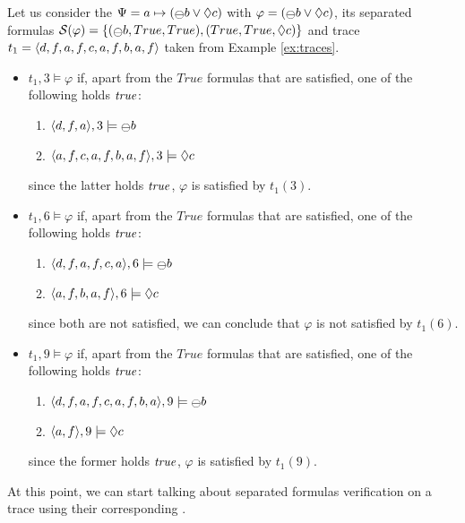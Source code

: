 \begin{example}\label{ex:subeval-formula}
Let us consider the \rcon\xspace $\Psi = a \mapsto (\Yesterday b \lOR \Diamond c)$ with $\varphi = (\Yesterday b \lOR \Diamond c)$, its separated formulas $\S(\varphi) = \{(\Yesterday b , True, True),(True, True, \Diamond c)\}$ and trace $t_1 = \langle d,f,a,f,c,a,f,b,a,f \rangle$ taken from Example \ref{ex:traces}.
\begin{itemize}
\item $t_1,3 \models \varphi$ if, apart from the $True$ formulas that are satisfied, one of the following holds $\mathit{true}$:
\begin{enumerate}
\item $\tup{d,f,a},3 \models \Yesterday b$
\item $\langle a,f,c,a,f,b,a,f \rangle,3 \models \Diamond c$
\end{enumerate}
since the latter holds $\mathit{true}$, $\varphi$ is satisfied by $t_1(3)$.

\item $t_1,6 \models \varphi$ if, apart from the $True$ formulas that are satisfied, one of the following holds $\mathit{true}$:
\begin{enumerate}
\item $\tup{d,f,a,f,c,a},6 \models \Yesterday b$
\item $\langle a,f,b,a,f \rangle,6 \models \Diamond c$
\end{enumerate}
since both are not satisfied, we can conclude that $\varphi$ is not satisfied by $t_1(6)$.

\item $t_1,9 \models \varphi$ if, apart from the $True$ formulas that are satisfied, one of the following holds $\mathit{true}$:
\begin{enumerate}
\item $\tup{d,f,a,f,c,a,f,b,a},9 \models \Yesterday b$
\item $\langle a,f \rangle,9 \models \Diamond c$
\end{enumerate}
since the former holds $\mathit{true}$, $\varphi$ is satisfied by $t_1(9)$.
\end{itemize}
\end{example}
At this point, we can start talking about separated formulas verification on a trace using their corresponding \DFAs.

